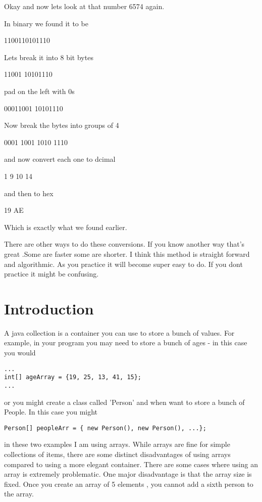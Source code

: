 \documentclass[12pt]{article}
\begin{document}
Okay and now lets look at that number 6574 again. 

In binary we found it to be

1100110101110

Lets break it into 8 bit bytes

11001 10101110

pad on the left with 0s

00011001 10101110

Now break the bytes into groups of 4


0001 1001 1010 1110

and now convert each one to dcimal

1    9    10   14

and then to hex

19 AE


Which is exactly what we found earlier. 

There are other ways to do these conversions. If you know another way that's
great .Some are faster some are shorter. I think this method is straight forward
and algorithmic. As you practice it will become super easy to do. If you dont
practice it might be confusing.

\section{Introduction}
A java collection is a container you can use to store a bunch of values. For example, in your program you may need to store a bunch of ages - in this case you would

\begin{lstlisting}
...
int[] ageArray = {19, 25, 13, 41, 15};
...
\end{lstlisting} 

or you might create a class called 'Person' and when want to store a bunch of People. In this case you might

\begin{lstlisting}
Person[] peopleArr = { new Person(), new Person(), ...};
\end{lstlisting}

in these two examples I am using arrays. While arrays are fine for simple collections of items, there are some distinct disadvantages of using arrays compared to using a more elegant container. There are some cases where using an array is extremely problematic. One major disadvantage is that the array size is fixed. Once you create an array of 5  elements , you cannot add a sixth person to the array.  
\end{document}

